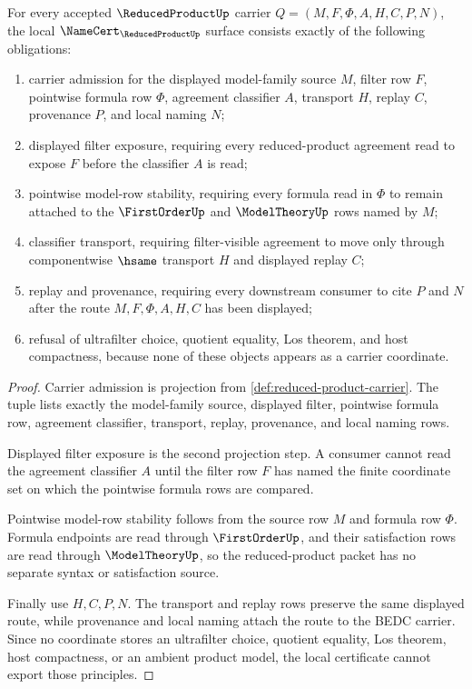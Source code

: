 \begin{theorem}
\label{thm:reduced-product-namecert-obligations}
For every accepted $\ReducedProductUp$ carrier $Q=(M,F,\Phi,A,H,C,P,N)$, the local $\NameCert_{\ReducedProductUp}$ surface consists exactly of the following obligations:
\begin{enumerate}
\item carrier admission for the displayed model-family source $M$, filter row $F$, pointwise formula row $\Phi$, agreement classifier $A$, transport $H$, replay $C$, provenance $P$, and local naming $N$;
\item displayed filter exposure, requiring every reduced-product agreement read to expose $F$ before the classifier $A$ is read;
\item pointwise model-row stability, requiring every formula read in $\Phi$ to remain attached to the $\FirstOrderUp$ and $\ModelTheoryUp$ rows named by $M$;
\item classifier transport, requiring filter-visible agreement to move only through componentwise $\hsame$ transport $H$ and displayed replay $C$;
\item replay and provenance, requiring every downstream consumer to cite $P$ and $N$ after the route $M,F,\Phi,A,H,C$ has been displayed;
\item refusal of ultrafilter choice, quotient equality, Los theorem, and host compactness, because none of these objects appears as a carrier coordinate.
\end{enumerate}
\end{theorem}
\begin{proof}
Carrier admission is projection from \autoref{def:reduced-product-carrier}. The tuple lists exactly the model-family source, displayed filter, pointwise formula row, agreement classifier, transport, replay, provenance, and local naming rows.

Displayed filter exposure is the second projection step. A consumer cannot read the agreement classifier $A$ until the filter row $F$ has named the finite coordinate set on which the pointwise formula rows are compared.

Pointwise model-row stability follows from the source row $M$ and formula row $\Phi$. Formula endpoints are read through $\FirstOrderUp$, and their satisfaction rows are read through $\ModelTheoryUp$, so the reduced-product packet has no separate syntax or satisfaction source.

Finally use $H,C,P,N$. The transport and replay rows preserve the same displayed route, while provenance and local naming attach the route to the BEDC carrier. Since no coordinate stores an ultrafilter choice, quotient equality, Los theorem, host compactness, or an ambient product model, the local certificate cannot export those principles.
\end{proof}


